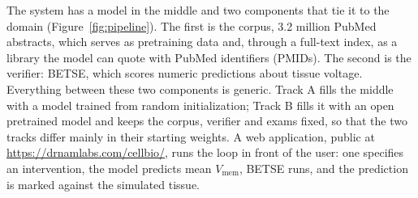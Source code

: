 \documentclass[11pt]{article}
\newcommand{\Vm}{V_\mathrm{mem}}
\begin{document}
The system has a model in the middle and two components that tie it to the
domain (Figure~\ref{fig:pipeline}). The first is the corpus, 3.2 million
PubMed abstracts, which serves as pretraining data and, through a full-text
index, as a library the model can quote with PubMed identifiers (PMIDs). The second is the
verifier: BETSE, which scores numeric predictions about tissue voltage.
Everything between these two components is generic. Track A fills the
middle with a model trained from random initialization; Track B fills it with
an open pretrained model and keeps the corpus, verifier and exams fixed, so
that the two tracks differ mainly in their starting weights. A web
application, public at \url{https://drnamlabs.com/cellbio/}, runs the loop
in front of the user: one specifies an intervention, the model predicts
mean $\Vm$, BETSE runs, and the prediction is marked against the simulated
tissue.
\end{document}
